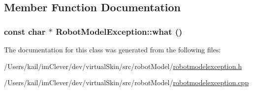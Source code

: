 \subsection{Member Function Documentation}
\hypertarget{class_robot_model_1_1_robot_model_exception_a96661f7c3b0cbb9c815b23c1eb315912}{
\subsubsection[{what}]{\setlength{\rightskip}{0pt plus 5cm}const char $\ast$ RobotModelException::what ()}}
\label{class_robot_model_1_1_robot_model_exception_a96661f7c3b0cbb9c815b23c1eb315912}


The documentation for this class was generated from the following files:\begin{DoxyCompactItemize}
\item 
/Users/kail/imClever/dev/virtualSkin/src/robotModel/\hyperlink{robotmodelexception_8h}{robotmodelexception.h}\item 
/Users/kail/imClever/dev/virtualSkin/src/robotModel/\hyperlink{robotmodelexception_8cpp}{robotmodelexception.cpp}\end{DoxyCompactItemize}
